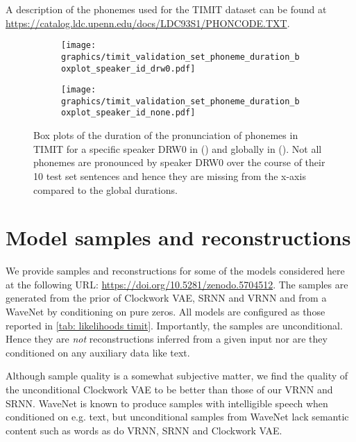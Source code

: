 {A description of the phonemes used for the TIMIT dataset can be found at \url{https://catalog.ldc.upenn.edu/docs/LDC93S1/PHONCODE.TXT}.

\begin{figure}[t!]
    \centering
    \hfill
    \begin{subfigure}[b]{\textwidth}
        \centering
        \texttt{[image: graphics/timit\_validation\_set\_phoneme\_duration\_boxplot\_speaker\_id\_drw0.pdf]}
        \caption{}
        \label{fig: timit validation set phoneme duration DRW0}
    \end{subfigure}
    \begin{subfigure}[b]{\textwidth}
        \centering
        \texttt{[image: graphics/timit\_validation\_set\_phoneme\_duration\_boxplot\_speaker\_id\_none.pdf]}
        \caption{}
        \label{fig: timit validation set phoneme duration global}
    \end{subfigure}
    \caption{Box plots of the duration of the pronunciation of phonemes in TIMIT for a specific speaker DRW0 in () and globally in (). Not all phonemes are pronounced by speaker DRW0 over the course of their 10 test set sentences and hence they are missing from the x-axis compared to the global durations.}
    \label{fig: timit validation set phoneme duration}
\end{figure}

\section{Model samples and reconstructions}\label{app: model samples and reconstructions}
We provide samples and reconstructions for some of the models considered here at the following URL: \url{https://doi.org/10.5281/zenodo.5704512}.
The samples are generated from the prior of Clockwork VAE, SRNN and VRNN and from a WaveNet by conditioning on pure zeros. All models are configured as those reported in \cref{tab: likelihoods timit}.
Importantly, the samples are unconditional. Hence they are \emph{not} reconstructions inferred from a given input nor are they conditioned on any auxiliary data like text.

Although sample quality is a somewhat subjective matter, we find the quality of the unconditional Clockwork VAE to be better than those of our VRNN and SRNN. WaveNet is known to produce samples with intelligible speech when conditioned on e.g. text, but unconditional samples from WaveNet lack semantic content such as words as do VRNN, SRNN and Clockwork VAE.

}
